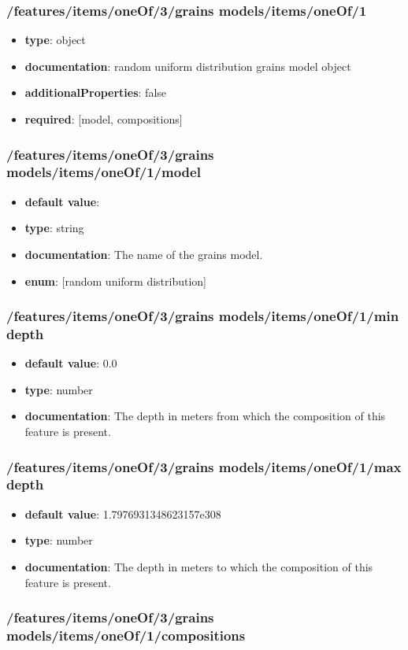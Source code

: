 \subsubsection{/features/items/oneOf/3/grains models/items/oneOf/1}
\begin{itemize}\item {\bf type}: object
\item {\bf documentation}: random uniform distribution grains model object
\item {\bf additionalProperties}: false
\item {\bf required}: [model, compositions]\end{itemize}
\subsubsection{/features/items/oneOf/3/grains models/items/oneOf/1/model}
\begin{itemize}\item {\bf default value}: 
\item {\bf type}: string
\item {\bf documentation}: The name of the grains model.
\item {\bf enum}: [random uniform distribution]\end{itemize}\subsubsection{/features/items/oneOf/3/grains models/items/oneOf/1/min depth}
\begin{itemize}\item {\bf default value}: 0.0
\item {\bf type}: number
\item {\bf documentation}: The depth in meters from which the composition of this feature is present.
\end{itemize}\subsubsection{/features/items/oneOf/3/grains models/items/oneOf/1/max depth}
\begin{itemize}\item {\bf default value}: 1.7976931348623157e308
\item {\bf type}: number
\item {\bf documentation}: The depth in meters to which the composition of this feature is present.
\end{itemize}\subsubsection{/features/items/oneOf/3/grains models/items/oneOf/1/compositions}
